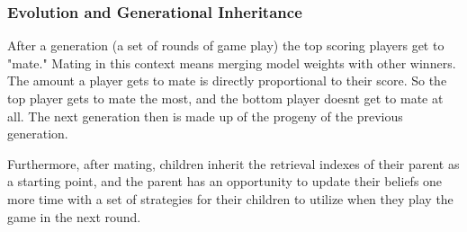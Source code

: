 \subsubsection{Evolution and Generational Inheritance}
After a generation (a set of rounds of game play) the top scoring players get to "mate." Mating in this context means merging model weights with other winners. The amount a player gets to mate is directly proportional to their score. So the top player gets to mate the most, and the bottom player doesnt get to mate at all. The next generation then is made up of the progeny of the previous generation.

Furthermore, after mating, children inherit the retrieval indexes of their parent as a starting point, and the parent has an opportunity to update their beliefs one more time with a set of strategies for their children to utilize when they play the game in the next round.